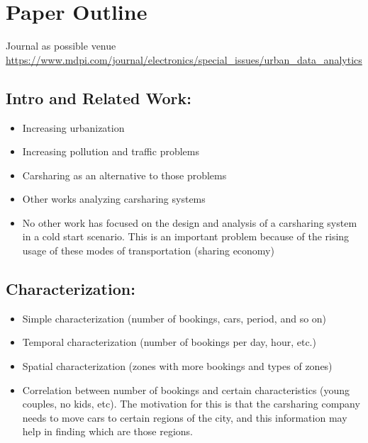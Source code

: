 \section{Paper Outline}
\label{sec:paper_outline}


Journal as possible venue \url{https://www.mdpi.com/journal/electronics/special_issues/urban_data_analytics}





\subsection{Intro and Related Work:}
\begin{itemize}
    \item {Increasing urbanization}
    \item {Increasing pollution and traffic problems}
    \item {Carsharing as an alternative to those problems}
    \item {Other works analyzing carsharing systems}
    \item {No other work has focused on the design and analysis of a carsharing system in a cold start scenario. This is an important problem because of the rising usage of these modes of transportation (sharing economy)}
\end{itemize}

\subsection{Characterization:}
\begin{itemize}
    \item {Simple characterization (number of bookings, cars, period, and so on)}
    \item {Temporal characterization (number of bookings per day, hour, etc.)}
    \item {Spatial characterization (zones with more bookings and types of zones)}
    \item {Correlation between number of bookings and certain characteristics (young couples, no kids, etc). The motivation for this is that the carsharing company needs to move cars to certain regions of the city, and this information may help in finding which are those regions.}
\end{itemize}

